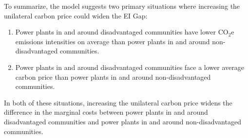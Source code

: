To summarize, the model suggests two primary situations where increasing the unilateral carbon price could widen the EI Gap:
\begin{enumerate}
    \item Power plants in and around disadvantaged communities have lower CO$_2$e emissions intensities on average than power plants in and around non-disadvantaged communities.
    \item Power plants in and around disadvantaged communities face a lower average carbon price than power plants in and around non-disadvantaged communities. 
\end{enumerate}
In both of these situations, increasing the unilateral carbon price widens the difference in the marginal costs between power plants in and around disadvantaged communities and power plants in and around non-disadvantaged communities. 



















